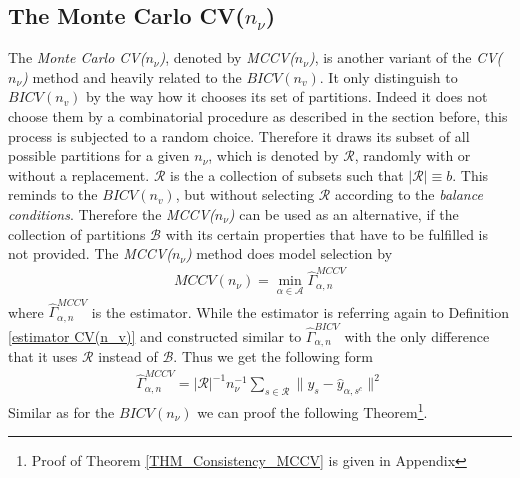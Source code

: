 \documentclass[Research_Module_ES.tex]{subfiles}
\begin{document}
\subsection{The Monte Carlo CV($n_\nu$)}
The \textit{Monte Carlo CV($n_\nu$)}, denoted by \textit{MCCV($n_\nu$)}, is another variant of the \textit{CV($n_\nu$)} method and heavily related to the $BICV(n_v)$. It only distinguish to $BICV(n_v)$ by the way how it chooses its set of partitions. Indeed it does not choose them by a combinatorial procedure as described in the section before, this process is subjected to a random choice. Therefore it draws its subset of all possible partitions for a given $n_\nu$, which is denoted by $\mathcal{R}$, randomly with or without a replacement. $\mathcal{R}$ is the a collection of subsets such that $|\mathcal{R}|\equiv b$. This reminds to the $BICV(n_v)$, but without selecting $\mathcal{R}$ according to the \textit{balance conditions}. Therefore the \textit{MCCV($n_\nu$)} can be used as an alternative, if the collection of partitions $\mathcal{B}$ with its certain properties that have to be fulfilled is not provided. The \textit{MCCV($n_\nu$)} method does model selection by 
\begin{align*}
MCCV(n_\nu)=\min_{\alpha\in\mathcal{A}}\hat{\Gamma}_{\alpha,n}^{MCCV}
\end{align*}
where $\hat{\Gamma}_{\alpha,n}^{MCCV}$ is the estimator. While the estimator is referring again to Definition \ref{estimator CV(n_v)} and constructed similar to $\hat{\Gamma}_{\alpha,n}^{BICV}$ with the only difference that it uses $\mathcal{R}$ instead of $\mathcal{B}$. Thus we get the following form
\begin{align*}
\hat{\Gamma}_{\alpha,n}^{MCCV}=|\mathcal{R}|^{-1}n_\nu^{-1}\sum_{s\in\mathcal{R}}\parallel y_s-\hat{y}_{\alpha,s^c}\parallel^2
\end{align*}
Similar as for the $BICV(n_\nu)$ we can proof the following Theorem\footnote{Proof of Theorem \ref{THM_Consistency_MCCV} is given in Appendix }. 
\end{document}
